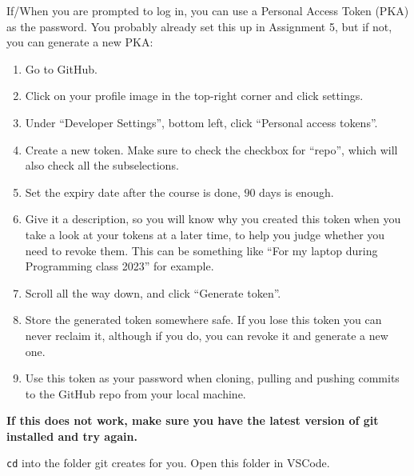 If/When you are prompted to log in, you can use a Personal Access Token (PKA) as the password.
You probably already set this up in Assignment 5, but if not, you can generate a new PKA:
\begin{enumerate}
    \item Go to GitHub.

    \item Click on your profile image in the top-right corner and click settings.

    \item
    Under ``Developer Settings'', bottom left,
    click ``Personal access tokens''.

    \item
    Create a new token.
    Make sure to check the checkbox for ``repo'',
    which will also check all the subselections.

    \item Set the expiry date after the course is done, $90$ days is enough.

    \item
    Give it a description,
    so you will know why you created this token
    when you take a look at your tokens at a later time,
    to help you judge whether you need to revoke them.
    This can be something like ``For my laptop during Programming class 2023'' for example.

    \item Scroll all the way down, and click ``Generate token''.

    \item
    Store the generated token somewhere safe.
    If you lose this token you can never reclaim it,
    although if you do, you can revoke it and generate a new one.

    \item Use this token as your password
    when cloning, pulling and pushing commits to the GitHub repo from your local machine.
\end{enumerate}

\textbf{If this does not work, make sure you have the latest version of git installed and try again.}

\texttt{cd} into the folder git creates for you.
Open this folder in VSCode.

